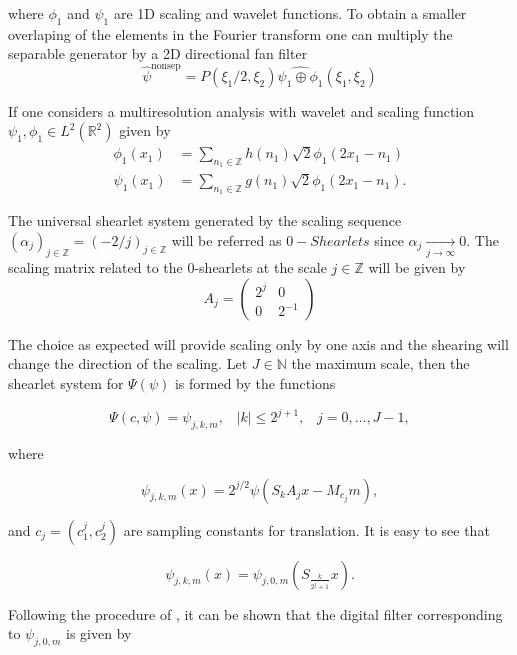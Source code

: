 where $\phi_1$ and $\psi_1$ are 1D scaling and wavelet functions. To obtain a smaller overlaping of the elements in the Fourier transform one can multiply the separable generator by a 2D directional fan filter
$$
\hat{\psi}^{\text{nonsep}}=P(\xi_1/2,\xi_2)\hat{\psi_1\oplus\phi_1}(\xi_1, \xi_2)
$$ 

\bigskip

If one considers a multiresolution analysis with wavelet and scaling function $\psi_1,\phi_1\in L^2(\mathbb{R}^2)$ given by
$$
\begin{aligned}
\phi_1(x_1)&=\sum_{n_1\in\mathbb{Z}}h(n_1)\sqrt{2}\phi_1(2x_1-n_1)\\
\psi_1(x_1)&=\sum_{n_1\in\mathbb{Z}}g(n_1)\sqrt{2}\phi_1(2x_1-n_1).
\end{aligned}
$$

\bigskip

The universal shearlet system generated by the scaling sequence $(\alpha_j)_{j\in \mathbb{Z}}=(-2/j)_{j\in\mathbb{Z}}$ will be referred as $0-Shearlets$ since $\alpha_j\underset{j\rightarrow\infty}\longrightarrow 0$. The scaling matrix related to the $0$-shearlets at the scale $j\in\mathbb{Z}$ will be given by
$$
A_{j}=\left(\begin{matrix} 2^j & 0\\ 0 & 2^{-1}\end{matrix}\right)
$$

The choice as expected will provide scaling only by one axis and the shearing will change the direction of the scaling. Let $J\in\mathbb{N}$ the maximum scale, then the shearlet system for $\Psi(\psi)$ is formed by the functions

$$
\Psi(c,\psi)=\psi_{j,k,m}\textrm{,}\quad |k|\leq 2^{j+1}\textrm{,}\quad j=0,\ldots,J-1,
$$

where

\begin{equation}
\label{eq:LFshearlets3}
\psi_{j,k,m}(x)=2^{j/2}\psi(S_kA_jx-M_{c_j}m),
\end{equation}

and $c_j=(c_1^j,c_2^j)$ are sampling constants for translation. It is easy to see that

\begin{equation}
\label{eq:LFshearlets4}
\psi_{j,k,m}(x)=\psi_{j,0,m}\left( S_{\frac{k}{2^j+1}}x\right).
\end{equation}

Following the procedure of \cite{Shearlab}, it can be shown that the digital filter corresponding to $\psi_{j,0,m}$ is given by

